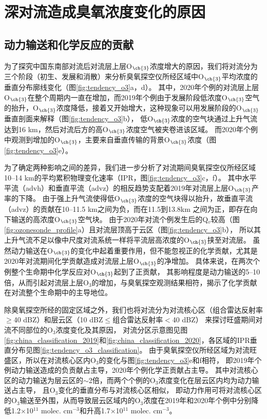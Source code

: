 \section{深对流造成臭氧浓度变化的原因} \label{sec:convec_impacts}

\subsection{动力输送和化学反应的贡献}

为了探究中国东南部对流后对流层上层O$_{\ch{3}}$浓度增大的原因，我们将对流分为三个阶段（初生、发展和消散）来分析臭氧探空仪所经区域中O$_{\ch{3}}$平均浓度的垂直分布廓线变化（图\ref{fig:tendency_o3}a，d）。
其中，2020年个例的对流层上层O$_{\ch{3}}$在整个周期内一直在增加，而2019年个例由于发展阶段低浓度O$_{\ch{3}}$空气的抬升，O$_{\ch{3}}$浓度降低，接着又开始增大，这种现象可以用发展阶段的O$_{\ch{3}}$垂直剖面来解释（图\ref{fig:tendency_o3}b），
低O$_{\ch{3}}$浓度的空气块通过上升气流达到16 km，然后对流后方的高O$_{\ch{3}}$浓度空气被夹卷进该区域。
而2020年个例中观测到增加的O$_{\ch{3}}$，主要来自垂直传输的背景O$_{\ch{3}}$浓度（图\ref{fig:tendency_o3}e）。

为了确定两种影响之间的差异，我们进一步分析了对流期间臭氧探空仪所经区域10--14 km的平均累积物理变化速率（IPR，图\ref{fig:tendency_o3}c，f）。
其中水平平流（advh）和垂直平流（advz）的相反趋势支配着2019年对流层上层O$_{\ch{3}}$产率的下降。
由于强上升气流使得低O$_{\ch{3}}$浓度的空气块得以抬升，故垂直平流（advz）的贡献在10--11.5 km之间为负，而在11.5到13.8km 之间为正，即存在向下输送的高浓度O$_{\ch{3}}$空气块。
由于2020年对流个例发生后的Q$_v$较高（图\ref{fig:ozonesonde_profile}a）且对流层顶高于云区（图\ref{fig:tendency_o3}b），
所以其上升气流不足以像中尺度对流系统一样将平流层高浓度的O$_{\ch{3}}$挟至对流层\citep{Phoenix.2020}。
虽然动力输送在O$_{\ch{3}}$的变化中起着重要作用，但不能忽视正的化学贡献，尤其是2020年对流期间化学贡献造成对流层上层O$_{\ch{3}}$的净增加。
具体来说，在两次个例整个生命期中化学反应对O$_{\ch{3}}$起到了正贡献，
其影响程度是动力输送的5--10倍，从而引起对流层上层O$_3$的增加，与臭氧探空观测结果相符，揭示了化学贡献在对流整个生命期中的主导地位。

除臭氧探空所经的固定区域之外，我们也将对流分为对流核心区（组合雷达反射率$\geq$40 dBZ）和层云区（10 dBZ$\leq$组合雷达反射率$<$40 dBZ）
来探讨旺盛期间对流不同部位的O$_3$浓度变化及其原因，
对流分区示意图见图\ref{fig:china_classification_2019}和\ref{fig:china_classification_2020}，各区域的IPR垂直分布见图\ref{fig:tendency_o3_classification}。
由于臭氧探空仪所经区域为对流旺盛区，所以在对流核心区内O$_3$的变化与图\ref{fig:tendency_o3}e和f相符，
即2019年个例动力输送造成的负贡献占主导，2020年个例化学正贡献占主导。
其中对流核心区的动力输送为层云区的$\sim$2倍，而两个个例的O$_3$浓度变化在层云区内均为动力输送占主导，
且O$_3$变化的垂直分布与对流核心区相似，
即动力作用可将对流核心区的O$_3$输送至外围，从而导致层云区域内的O$_3$浓度在2019年和2020年个例中分别降低1.2$\times$10$^{11}$ molec. cm$^{-3}$和升高1.7$\times$10$^{11}$ molec. cm$^{-3}$。


